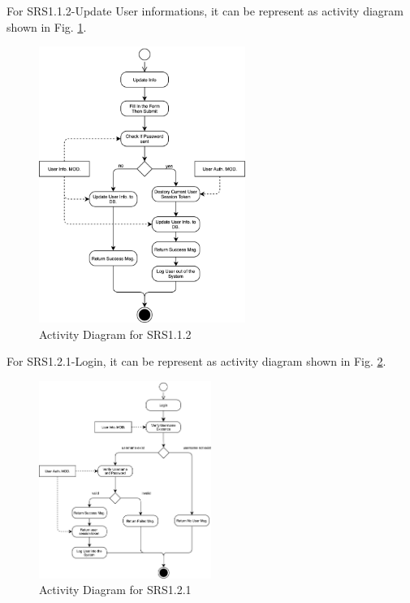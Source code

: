 For SRS1.1.2-Update User informations, it can be represent as activity diagram shown in Fig. \ref{fig:srs_diagram_2}.

\begin{figure}[t]
	\centering
	\includegraphics[width=0.6\textwidth]{./img/srs_diagram_2.png}
	\caption{Activity Diagram for SRS1.1.2}
	\label{fig:srs_diagram_2}
\end{figure}

For SRS1.2.1-Login, it can be represent as activity diagram shown in Fig. \ref{fig:srs_diagram_3}.

\begin{figure}[t]
	\centering
	\includegraphics[width=0.5\textwidth]{./img/srs_diagram_3.png}
	\caption{Activity Diagram for SRS1.2.1}
	
	\label{fig:srs_diagram_3}
\end{figure}


